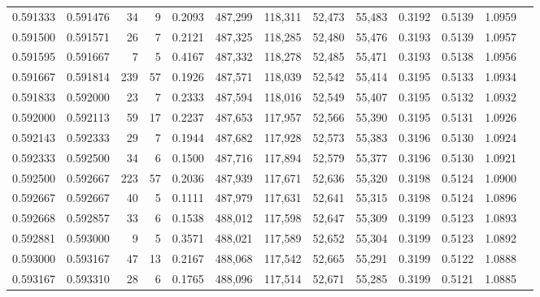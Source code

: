 \begin{tabular}{rrrrrrrrrrrrr}
0.591333 & 0.591476 &    34 &   9 &                                     0.2093 & 487,299 & 118,311 &  52,473 &  55,483 & 0.3192 & 0.5139 & 1.0959 \\
0.591500 & 0.591571 &    26 &   7 &                                     0.2121 & 487,325 & 118,285 &  52,480 &  55,476 & 0.3193 & 0.5139 & 1.0957 \\
0.591595 & 0.591667 &     7 &   5 &                                     0.4167 & 487,332 & 118,278 &  52,485 &  55,471 & 0.3193 & 0.5138 & 1.0956 \\
0.591667 & 0.591814 &   239 &  57 &                                     0.1926 & 487,571 & 118,039 &  52,542 &  55,414 & 0.3195 & 0.5133 & 1.0934 \\
0.591833 & 0.592000 &    23 &   7 &                                     0.2333 & 487,594 & 118,016 &  52,549 &  55,407 & 0.3195 & 0.5132 & 1.0932 \\
0.592000 & 0.592113 &    59 &  17 &                                     0.2237 & 487,653 & 117,957 &  52,566 &  55,390 & 0.3195 & 0.5131 & 1.0926 \\
0.592143 & 0.592333 &    29 &   7 &                                     0.1944 & 487,682 & 117,928 &  52,573 &  55,383 & 0.3196 & 0.5130 & 1.0924 \\
0.592333 & 0.592500 &    34 &   6 &                                     0.1500 & 487,716 & 117,894 &  52,579 &  55,377 & 0.3196 & 0.5130 & 1.0921 \\
0.592500 & 0.592667 &   223 &  57 &                                     0.2036 & 487,939 & 117,671 &  52,636 &  55,320 & 0.3198 & 0.5124 & 1.0900 \\
0.592667 & 0.592667 &    40 &   5 &                                     0.1111 & 487,979 & 117,631 &  52,641 &  55,315 & 0.3198 & 0.5124 & 1.0896 \\
0.592668 & 0.592857 &    33 &   6 &                                     0.1538 & 488,012 & 117,598 &  52,647 &  55,309 & 0.3199 & 0.5123 & 1.0893 \\
0.592881 & 0.593000 &     9 &   5 &                                     0.3571 & 488,021 & 117,589 &  52,652 &  55,304 & 0.3199 & 0.5123 & 1.0892 \\
0.593000 & 0.593167 &    47 &  13 &                                     0.2167 & 488,068 & 117,542 &  52,665 &  55,291 & 0.3199 & 0.5122 & 1.0888 \\
0.593167 & 0.593310 &    28 &   6 &                                     0.1765 & 488,096 & 117,514 &  52,671 &  55,285 & 0.3199 & 0.5121 & 1.0885 \\

\end{tabular}
